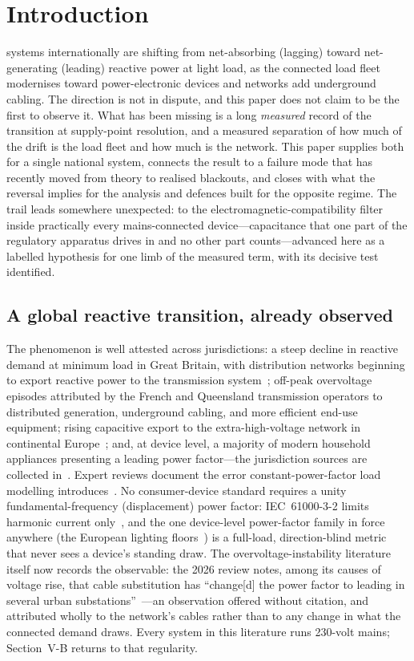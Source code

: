 \documentclass[journal]{IEEEtran}
\begin{document}
\section{Introduction}
 systems internationally are shifting from net-absorbing
(lagging) toward net-generating (leading) reactive power at light load, as the
connected load fleet modernises toward power-electronic devices and networks add
underground cabling. The direction is not in dispute, and this paper does not
claim to be the first to observe it. What has been missing is a long
\emph{measured} record of the transition at supply-point resolution, and a
measured separation of how much of the drift is the load fleet and how much is
the network. This paper supplies both for a single national system, connects the
result to a failure mode that has recently moved from theory to realised
blackouts, and closes with what the reversal implies for the analysis and
defences built for the opposite regime. The trail leads somewhere unexpected: to
the electromagnetic-compatibility filter inside practically every mains-connected
device---capacitance that one part of the regulatory apparatus drives in and no
other part counts---advanced here as a labelled hypothesis for one limb of the
measured term, with its decisive test identified.

\subsection{A global reactive transition, already observed}
The phenomenon is well attested across jurisdictions: a steep decline in reactive
demand at minimum load in Great Britain, with distribution networks beginning to
export reactive power to the transmission system~\cite{kaloudas2017}; off-peak
overvoltage episodes attributed by the French and Queensland transmission
operators to distributed generation, underground cabling, and more efficient
end-use equipment; rising capacitive export to the extra-high-voltage network in
continental Europe~\cite{tazky2021}; and, at device level, a majority of modern
household appliances presenting a leading power factor---the jurisdiction sources
are collected in~\cite{hume_extended}. Expert reviews document the error
constant-power-factor load modelling
introduces~\cite{cigre_tb719,epri_loadmodel}. No consumer-device standard requires
a unity fundamental-frequency (displacement) power factor: IEC~61000-3-2 limits harmonic current only~\cite{iec61000_3_2}, and the one device-level power-factor
family in force anywhere (the European lighting floors~\cite{eu_lighting2020}) is
a full-load, direction-blind metric that never sees a device's standing draw. The
overvoltage-instability literature itself now records the observable: the 2026
review notes, among its causes of voltage rise, that cable substitution has
``change[d] the power factor to leading in several urban
substations''~\cite{vournas2026review}---an observation offered without citation,
and attributed wholly to the network's cables rather than to any change in what
the connected demand draws. Every system in this literature runs 230-volt mains;
Section~V-B returns to that regularity.
\end{document}
